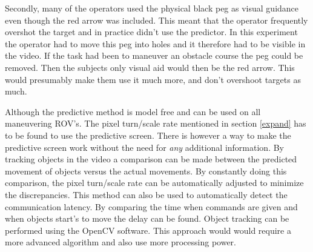Secondly, many of the operators used the physical black peg as visual guidance even though the red arrow was included. This meant that the operator frequently overshot the target and in practice didn't use the predictor. In this experiment the operator had to move this peg into holes and it therefore had to be visible in the video. If the task had been to maneuver an obstacle course the peg could be removed. Then the subjects only visual aid would then be the red arrow. This would presumably make them use it much more, and don't overshoot targets as much.

Although the predictive method is model free and can be used on all maneuvering ROV's. The pixel turn/scale rate mentioned in section \ref{expand} has to be found to use the predictive screen. There is however a way to make the predictive screen work without the need for \textit{any} additional information. By tracking objects in the video a comparison can be made between the predicted movement of objects versus the actual movements. By constantly doing this comparison, the pixel turn/scale rate can be automatically adjusted to minimize the discrepancies. This method can also be used to automatically detect the communication latency. By comparing the time when commands are given and when objects start's to move the delay can be found. Object tracking can be performed using the OpenCV software. This approach would would require a more advanced algorithm and also use more processing power.

